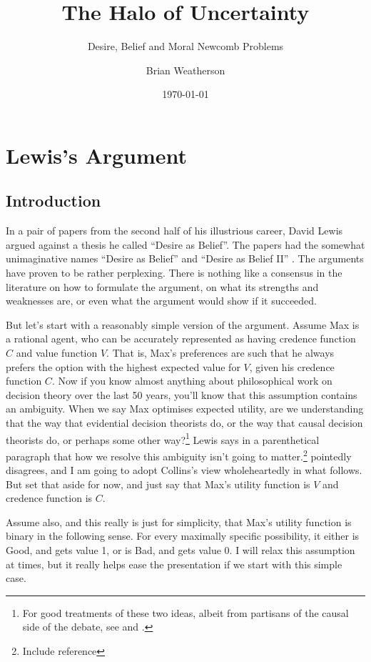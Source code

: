 \documentclass[11pt,]{book}
\title{The Halo of Uncertainty}
\subtitle{Desire, Belief and Moral Newcomb Problems}
\author{Brian Weatherson}
\date{\today}
\let\rmarkdownfootnote\footnote%
\def\footnote{\protect\rmarkdownfootnote}
\begin{document}
\maketitle

{
\setcounter{tocdepth}{1}
\tableofcontents
}
\hypertarget{lewiss-argument}{%
\chapter{Lewis's Argument}\label{lewiss-argument}}

\hypertarget{introduction}{%
\section{Introduction}\label{introduction}}

In a pair of papers from the second half of his illustrious career, David Lewis argued against a thesis he called ``Desire as Belief''. The papers had the somewhat unimaginative names ``Desire as Belief'' \citep{Lewis1988} and ``Desire as Belief II'' \citep{Lewis1996}. The arguments have proven to be rather perplexing. There is nothing like a consensus in the literature on how to formulate the argument, on what its strengths and weaknesses are, or even what the argument would show if it succeeded.

But let's start with a reasonably simple version of the argument. Assume Max is a rational agent, who can be accurately represented as having credence function \(C\) and value function \(V\). That is, Max's preferences are such that he always prefers the option with the highest expected value for \(V\), given his credence function \(C\). Now if you know almost anything about philosophical work on decision theory over the last 50 years, you'll know that this assumption contains an ambiguity. When we say Max optimises expected utility, are we understanding that the way that evidential decision theorists do, or the way that causal decision theorists do, or perhaps some other way?\footnote{For good treatments of these two ideas, albeit from partisans of the causal side of the debate, see \citet{Weyrich2012} and \citet{Joyce1999}.} Lewis says in a parenthetical paragraph that how we resolve this ambiguity isn't going to matter.\footnote{Include reference} \citet{Collins2015} pointedly disagrees, and I am going to adopt Collins's view wholeheartedly in what follows. But set that aside for now, and just say that Max's utility function is \(V\) and credence function is \(C\).

Assume also, and this really is just for simplicity, that Max's utility function is binary in the following sense. For every maximally specific possibility, it either is Good, and gets value 1, or is Bad, and gets value 0. I will relax this assumption at times, but it really helps ease the presentation if we start with this simple case.
\end{document}
